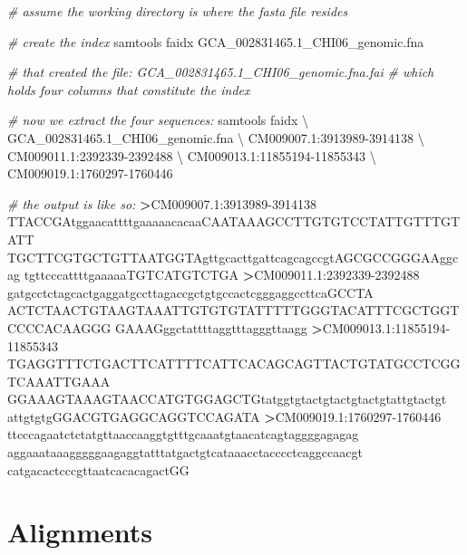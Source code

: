 \documentclass[]{krantz}
\makeatletter
\newenvironment{Shaded}{\begin{snugshade}}{\end{snugshade}}
\newcommand{\CommentTok}[1]{\textcolor[rgb]{0.37,0.37,0.37}{\textit{#1}}}
\newcommand{\ExtensionTok}[1]{#1}
\newcommand{\NormalTok}[1]{#1}
\newcommand{\OperatorTok}[1]{\textcolor[rgb]{0.43,0.43,0.43}{\textbf{#1}}}
\newenvironment{kframe}{%
\medskip{}
\setlength{\fboxsep}{.8em}
 \def\at@end@of@kframe{}%
 \ifinner\ifhmode%
  \def\at@end@of@kframe{\end{minipage}}%
  \begin{minipage}{\columnwidth}%
 \fi\fi%
 \def\FrameCommand##1{\hskip\@totalleftmargin \hskip-\fboxsep
 \colorbox{shadecolor}{##1}\hskip-\fboxsep
     \hskip-\linewidth \hskip-\@totalleftmargin \hskip\columnwidth}%
 \MakeFramed {\advance\hsize-\width
   \@totalleftmargin\z@ \linewidth\hsize
   \@setminipage}}%
 {\par\unskip\endMakeFramed%
 \at@end@of@kframe}
\renewenvironment{Shaded}{\begin{kframe}}{\end{kframe}}
\makeatother
\begin{document}
\begin{Shaded}
\begin{Highlighting}[]
\CommentTok{# assume the working directory is where the fasta file resides}

\CommentTok{# create the index}
\ExtensionTok{samtools}\NormalTok{ faidx GCA_002831465.1_CHI06_genomic.fna}

\CommentTok{# that created the file: GCA_002831465.1_CHI06_genomic.fna.fai}
\CommentTok{# which holds four columns that constitute the index}

\CommentTok{# now we extract the four sequences:}
\ExtensionTok{samtools}\NormalTok{ faidx \textbackslash{}}
\NormalTok{    GCA_002831465.1_CHI06_genomic.fna \textbackslash{}}
\NormalTok{    CM009007.1:3913989-3914138 \textbackslash{}}
\NormalTok{    CM009011.1:2392339-2392488 \textbackslash{}}
\NormalTok{    CM009013.1:11855194-11855343 \textbackslash{}}
\NormalTok{    CM009019.1:1760297-1760446}
    
\CommentTok{# the output is like so:}
\OperatorTok{>}\ExtensionTok{CM009007.1}\NormalTok{:3913989-3914138}
\ExtensionTok{TTACCGAtggaacattttgaaaaacacaaCAATAAAGCCTTGTGTCCTATTGTTTGTATT}
\ExtensionTok{TGCTTCGTGCTGTTAATGGTAgttgcacttgattcagcagccgtAGCGCCGGGAAggcag}
\ExtensionTok{tgttcccattttgaaaaaTGTCATGTCTGA}
\OperatorTok{>}\ExtensionTok{CM009011.1}\NormalTok{:2392339-2392488}
\ExtensionTok{gatgcctctagcactgaggatgccttagaccgctgtgccactcgggaggccttcaGCCTA}
\ExtensionTok{ACTCTAACTGTAAGTAAATTGTGTGTATTTTTGGGTACATTTCGCTGGTCCCCACAAGGG}
\ExtensionTok{GAAAGggctattttaggtttagggttaagg}
\OperatorTok{>}\ExtensionTok{CM009013.1}\NormalTok{:11855194-11855343}
\ExtensionTok{TGAGGTTTCTGACTTCATTTTCATTCACAGCAGTTACTGTATGCCTCGGTCAAATTGAAA}
\ExtensionTok{GGAAAGTAAAGTAACCATGTGGAGCTGtatggtgtactgtactgtactgtattgtactgt}
\ExtensionTok{attgtgtgGGACGTGAGGCAGGTCCAGATA}
\OperatorTok{>}\ExtensionTok{CM009019.1}\NormalTok{:1760297-1760446}
\ExtensionTok{ttcccagaatctctatgttaaccaaggtgtttgcaaatgtaacatcagtaggggagagag}
\ExtensionTok{aggaaataaagggggaagaggtatttatgactgtcataaacctacccctcaggccaacgt}
\ExtensionTok{catgacactcccgttaatcacacagactGG}
\end{Highlighting}
\end{Shaded}

\hypertarget{alignments}{%
\section{Alignments}\label{alignments}}
\end{document}

